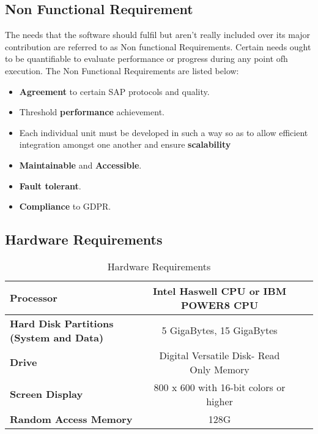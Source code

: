 \subsection{Non Functional Requirement}
The needs that the software should fulfil but aren't really included over its major contribution
are referred to as Non functional Requirements. Certain needs ought to be quantifiable to
evaluate performance or progress during any point ofh execution. The Non Functional
Requirements are listed below:

\begin{itemize}
    \item \textbf{Agreement} to certain SAP protocols and quality.
    \item Threshold \textbf{performance} achievement.
    \item Each individual unit must be developed in such a way so as to allow efficient
    integration amongst one another and ensure \textbf{scalability} 
    \item \textbf{Maintainable} and \textbf{Accessible}.
    \item \textbf{Fault tolerant}.
    \item \textbf{Compliance} to GDPR.
    

\end{itemize}

\subsection{Hardware Requirements}


\begin{table}[H]
    \fontsize{10}{12}\selectfont
    \caption{Hardware Requirements}
    \label{c1:hardware_requirements}
    \begin{center}
    \begin{tabular}{|p{7cm}|c|c|c|}
        \hline
        \textbf{Processor }& Intel Haswell CPU or IBM POWER8 CPU \\ \hline
        \textbf{Hard Disk Partitions (System and Data)}    &   5 GigaBytes, 15 GigaBytes       \\\hline
        \textbf{Drive}    &   Digital Versatile Disk- Read Only Memory         \\\hline
        \textbf{Screen Display}    &   800 x 600 with 16-bit colors or higher  \\\hline
        \textbf{Random Access Memory}    &   128G \\\hline

    \end{tabular}
    \end{center}
    \end{table}
    
